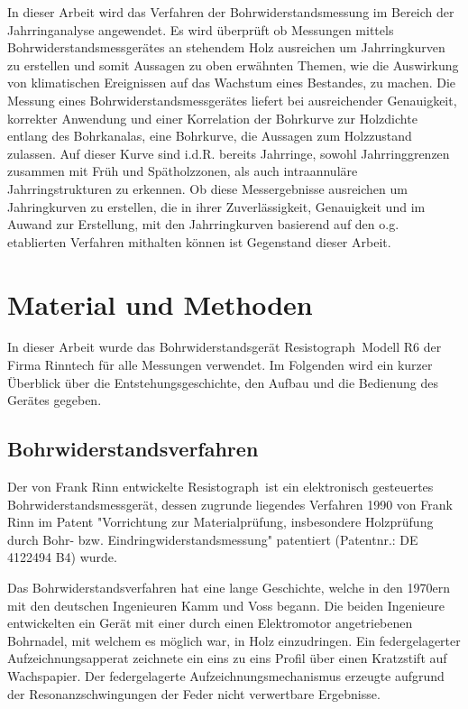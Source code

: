 \documentclass[a4paper, halfparskip]{article}
\def\SymbReg{\textsuperscript{\textregistered}}
\begin{document}
In dieser Arbeit wird das Verfahren der Bohrwiderstandsmessung im Bereich der
Jahrringanalyse angewendet. Es wird überprüft ob Messungen mittels
Bohrwiderstandsmessgerätes an stehendem Holz ausreichen um Jahrringkurven zu
erstellen und somit Aussagen zu oben erwähnten Themen, wie die Auswirkung von
klimatischen Ereignissen auf das Wachstum eines Bestandes, zu machen. Die
Messung eines Bohrwiderstandsmessgerätes liefert bei ausreichender
Genauigkeit, korrekter Anwendung und einer Korrelation der Bohrkurve zur
Holzdichte entlang des Bohrkanalas, eine Bohrkurve, die Aussagen
zum Holzzustand zulassen. Auf dieser Kurve sind i.d.R. bereits
Jahrringe, sowohl Jahrringgrenzen zusammen mit Früh und Spätholzzonen, als
auch intraannuläre Jahrringstrukturen zu erkennen. Ob diese Messergebnisse
ausreichen um Jahringkurven zu erstellen, die in ihrer Zuverlässigkeit,
Genauigkeit und im Auwand zur Erstellung, mit den Jahrringkurven basierend auf
den o.g. etablierten Verfahren mithalten können ist Gegenstand dieser Arbeit.



\section{Material und Methoden}\label{sec:material}
In dieser Arbeit wurde das Bohrwiderstandsgerät Resistograph\SymbReg\ Modell
R6 der Firma Rinntech für alle Messungen verwendet. Im Folgenden wird ein
kurzer Überblick über die Entstehungsgeschichte, den Aufbau und die Bedienung
des Gerätes gegeben.
\subsection{Bohrwiderstandsverfahren}\label{subsec:bohrwiderstandsverfahren}

Der von Frank Rinn entwickelte Resistograph\SymbReg\ ist ein elektronisch
gesteuertes Bohrwiderstandsmessgerät, dessen zugrunde liegendes Verfahren 1990
von Frank Rinn im Patent "Vorrichtung zur Materialprüfung, insbesondere
Holzprüfung durch Bohr- bzw. Eindringwiderstandsmessung"{} patentiert
(Patentnr.: DE 4122494 B4) wurde.

Das Bohrwiderstandsverfahren hat eine lange Geschichte, welche in den 1970ern
mit den deutschen Ingenieuren Kamm und Voss begann. Die beiden Ingenieure
entwickelten ein Gerät mit einer durch einen Elektromotor angetriebenen
Bohrnadel, mit welchem es möglich war, in Holz einzudringen. Ein
federgelagerter Aufzeichnungsapperat zeichnete ein eins zu eins Profil über
einen Kratzstift auf Wachspapier. Der federgelagerte Aufzeichnungsmechanismus
erzeugte aufgrund der Resonanzschwingungen der Feder nicht verwertbare
Ergebnisse. 
\end{document}
